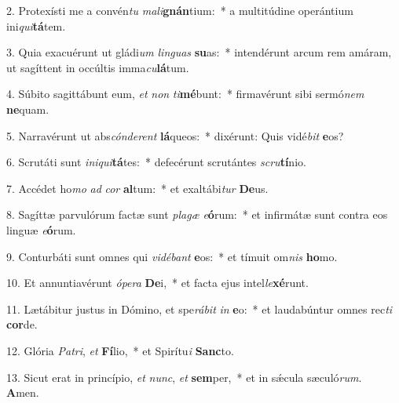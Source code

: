 2. Protexísti me a convén\textit{tu} \textit{ma}\textit{li}\textbf{gnán}tium:~*  a multitúdine operántium ini\textit{qui}\textbf{tá}tem.\

3. Quia exacuérunt ut gládi\textit{um} \textit{lin}\textit{guas} \textbf{su}as:~*  intendérunt arcum rem amáram, ut sagíttent in occúltis imma\textit{cu}\textbf{lá}tum.\

4. Súbito sagittábunt eum, \textit{et} \textit{non} \textit{ti}\textbf{mé}bunt:~*  firmavérunt sibi sermó\textit{nem} \textbf{ne}quam.\

5. Narravérunt ut abs\textit{cón}\textit{de}\textit{rent} \textbf{lá}queos:~*  dixérunt: Quis vidé\textit{bit} \textbf{e}os?\

6. Scrutáti sunt \textit{in}\textit{i}\textit{qui}\textbf{tá}tes:~*  defecérunt scrutántes \textit{scru}\textbf{tí}nio.\

7. Accédet ho\textit{mo} \textit{ad} \textit{cor} \textbf{al}tum:~*  et exaltábi\textit{tur} \textbf{De}us.\

8. Sagíttæ parvulórum factæ sunt \textit{pla}\textit{gæ} \textit{e}\textbf{ó}rum:~*  et infirmátæ sunt contra eos linguæ \textit{e}\textbf{ó}rum.\

9. Conturbáti sunt omnes qui \textit{vi}\textit{dé}\textit{bant} \textbf{e}os:~*  et tímuit om\textit{nis} \textbf{ho}mo.\

10. Et annuntiavérunt \textit{ó}\textit{pe}\textit{ra} \textbf{De}i,~*  et facta ejus intel\textit{le}\textbf{xé}runt.\

11. Lætábitur justus in Dómino, et spe\textit{rá}\textit{bit} \textit{in} \textbf{e}o:~*  et laudabúntur omnes rec\textit{ti} \textbf{cor}de.\

12. Glória \textit{Pa}\textit{tri}, \textit{et} \textbf{Fí}lio,~*  et Spirítu\textit{i} \textbf{Sanc}to.\

13. Sicut erat in princípio, \textit{et} \textit{nunc}, \textit{et} \textbf{sem}per,~*  et in sǽcula sæculó\textit{rum}. \textbf{A}men.\

